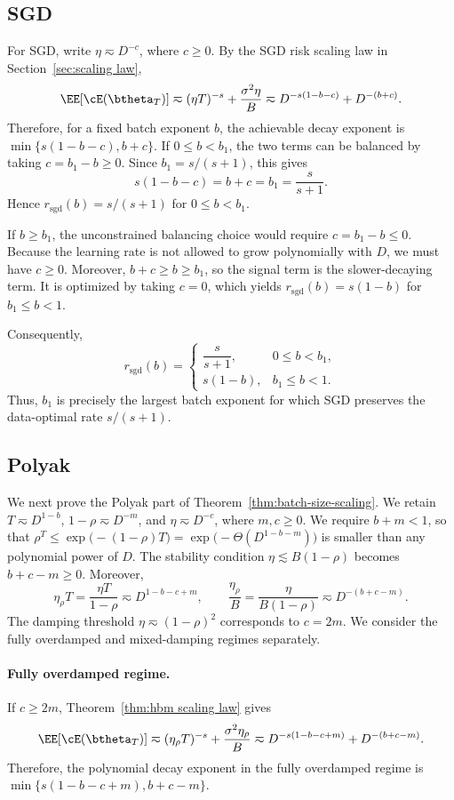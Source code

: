 \documentclass[11pt]{article}
\newcommand{\sgd}{\mathrm{sgd}}
\begin{document}
\subsection{SGD}
For SGD, write $\eta\eqsim D^{-c}$, where $c\ge0$. By the SGD risk scaling law in Section~\ref{sec:scaling law},
\[
\EE[\cE(\btheta_T)]\eqsim(\eta T)^{-s}+\frac{\sigma^2\eta}{B}\eqsim D^{-s(1-b-c)}+D^{-(b+c)}.
\]
Therefore, for a fixed batch exponent $b$, the achievable decay exponent is $\min\{s(1-b-c),b+c\}$. If $0\le b<b_1$, the two terms can be balanced by taking $c=b_1-b\ge0$. Since $b_1=s/(s+1)$, this gives
\[
s(1-b-c)=b+c=b_1=\frac{s}{s+1}.
\]
Hence $r_{\sgd}(b)=s/(s+1)$ for $0\le b<b_1$. 

If $b\ge b_1$, the unconstrained balancing choice would require $c=b_1-b\le0$. Because the learning rate is not allowed to grow polynomially with $D$, we must have $c\ge0$. Moreover, $b+c\ge b\ge b_1$, so the signal term is the slower-decaying term. It is optimized by taking $c=0$, which yields $r_{\sgd}(b)=s(1-b)$ for $b_1\le b<1$. 

Consequently,
\[
r_{\sgd}(b)=
\begin{cases}
\dfrac{s}{s+1},&0\le b<b_1,\\[4pt]
s(1-b),&b_1\le b<1.
\end{cases}
\]
Thus, $b_1$ is precisely the largest batch exponent for which SGD preserves the data-optimal rate $s/(s+1)$.

\subsection{Polyak}
We next prove the Polyak part of Theorem~\ref{thm:batch-size-scaling}. We retain $T\eqsim D^{1-b}$, $1-\rho\eqsim D^{-m}$, and $\eta\eqsim D^{-c}$, where $m,c\ge0$. We require $b+m<1$, so that $\rho^T\leq\exp\bigl(-(1-\rho)T\bigr)=\exp\bigl(-\Theta(D^{1-b-m})\bigr)$ is smaller than any polynomial power of $D$. The stability condition $\eta\lesssim B(1-\rho)$ becomes $b+c-m\ge0$. Moreover,
\[
\eta_\rho T=\frac{\eta T}{1-\rho}\eqsim D^{1-b-c+m},\qquad \frac{\eta_\rho}{B}=\frac{\eta}{B(1-\rho)}\eqsim D^{-(b+c-m)}.
\]
The damping threshold $\eta\eqsim(1-\rho)^2$ corresponds to $c=2m$. We consider the fully overdamped and mixed-damping regimes separately.

\paragraph{Fully overdamped regime.} If $c\ge2m$, Theorem~\ref{thm:hbm scaling law} gives
\[
\EE[\cE(\btheta_T)]\eqsim(\eta_\rho T)^{-s}+\frac{\sigma^2\eta_\rho}{B}\eqsim D^{-s(1-b-c+m)}+D^{-(b+c-m)}.
\]
Therefore, the polynomial decay exponent in the fully overdamped regime is $\min\{s(1-b-c+m),b+c-m\}$.
\end{document}
